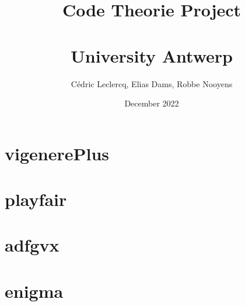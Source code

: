 \documentclass{article}
\title{Code Theorie Project\\\\ University Antwerp}
\author{Cédric Leclercq, Elias Dams, Robbe Nooyens}
\date{December 2022}
\begin{document}
\maketitle

\tableofcontents

\newpage

\section{vigenerePlus}
\section{playfair}
\section{adfgvx}
\section{enigma}
\end{document}

